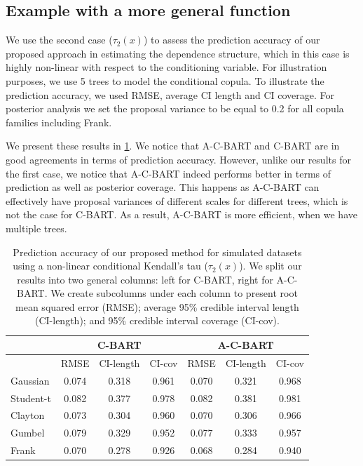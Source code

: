 \documentclass[
12pt]{article}
\begin{document}
	\subsection{Example with a more general function}
	We use the second case ($\tau_2(x)$) to assess the prediction accuracy of our proposed approach in estimating the dependence structure, which in this case is highly non-linear with respect to the conditioning variable. For illustration purposes, we use 5 trees to model the conditional copula. To illustrate the prediction accuracy, we used RMSE, average CI length and CI coverage. For posterior analysis we set the proposal variance to be equal to 0.2 for all copula families including Frank.
	
	We present these results in \cref{tab:pred:ex2}. We notice that A-C-BART and C-BART are in good agreements in terms of prediction accuracy. However, unlike our results for the first case, we notice that A-C-BART indeed performs better in terms of prediction as well as posterior coverage. This happens as A-C-BART can effectively have proposal variances of different scales for different trees, which is not the case for C-BART. As a result, A-C-BART is more efficient, when we have multiple trees.
	
	\begin{table}[h]
		\centering
		\begin{tabular}{l|ccc|ccc}
			\multicolumn{1}{c|}{} &
			\multicolumn{3}{c|}{C-BART} &
			\multicolumn{3}{c}{A-C-BART} \\
			\hline
			& RMSE & CI-length & CI-cov & RMSE & CI-length & CI-cov \\ 
			\hline
			Gaussian & 0.074 & 0.318 & 0.961 & 0.070 & 0.321 & 0.968 \\ 
			Student-t & 0.082 & 0.377 & 0.978 & 0.082 & 0.381 & 0.981 \\ 
			Clayton & 0.073 & 0.304 & 0.960 & 0.070 & 0.306 & 0.966 \\ 
			Gumbel & 0.079 & 0.329 & 0.952 & 0.077 & 0.333 & 0.957 \\ 
			Frank & 0.070 & 0.278 & 0.926 & 0.068 & 0.284 & 0.940 \\  
		\end{tabular}
		\caption{Prediction accuracy of our proposed method for simulated datasets using a non-linear conditional Kendall's tau ($\tau_2(x)$). We split our results into two general columns: left for C-BART, right for A-C-BART. We create subcolumns under each column to present root mean squared error (RMSE); average 95\% credible interval length (CI-length); and 95\% credible interval coverage (CI-cov).}
		\label{tab:pred:ex2}
	\end{table}
	
\end{document}
